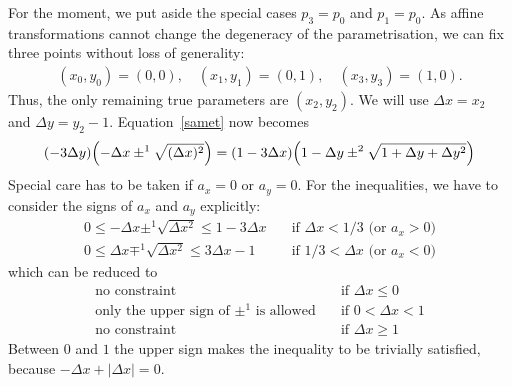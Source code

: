 \documentclass{article}
\begin{document}
For the moment, we put aside the special cases $p_3=p_0$ and $p_1=p_0$. As
affine transformations cannot change the degeneracy of the parametrisation, we
can fix three points without loss of generality:
%
\begin{equation}
  \begin{aligned}
    (x_0, y_0) = (0, 0),\quad
    (x_1, y_1) = (0, 1),\quad
    (x_3, y_3) = (1, 0).
  \end{aligned}
\end{equation}
%
Thus, the only remaining true parameters are $(x_2, y_2)$. We will use $\Delta x
= x_2$ and $\Delta y = y_2 - 1$. Equation~\eqref{samet} now becomes
%
\begin{equation}
%
%
 \label{samet2}
   ( -3\Delta y) \Bigl(-\Delta x  \pm^1 \sqrt{(\Delta x  )^2           }\Bigr)
 = (1-3\Delta x) \Bigl(1-\Delta y \pm^2 \sqrt{1 + \Delta y + \Delta y^2}\Bigr)
\end{equation}
%
Special care has to be taken if $a_x=0$ or $a_y=0$. For the inequalities, we
have to consider the signs of $a_x$ and $a_y$ explicitly:
\arraycolsep=0pt
%
\begin{equation}
  \begin{aligned}
  0 \leq -\Delta x \pm^1 \sqrt{\Delta x^2} \leq 1-3\Delta x &\quad\text{if $\Delta x < 1/3$ (or $a_x > 0$)} \\
  0 \leq  \Delta x \mp^1 \sqrt{\Delta x^2} \leq 3\Delta x-1 &\quad\text{if $1/3 < \Delta x$ (or $a_x < 0$)}
  \end{aligned}
\end{equation}
%
which can be reduced to
%
\begin{equation}
  \label{constr1}
  \begin{aligned}
  \text{no constraint} &\quad\text{if $\Delta x \leq 0$} \\
  \text{only the upper sign of $\pm^1$ is allowed} &\quad\text{if $0 < \Delta x < 1$} \\
  \text{no constraint} &\quad\text{if $\Delta x \geq 1$}
  \end{aligned}
\end{equation}
%
Between $0$ and $1$ the upper sign makes the inequality to be trivially
satisfied, because $-\Delta x + |\Delta x| = 0$.
\end{document}
